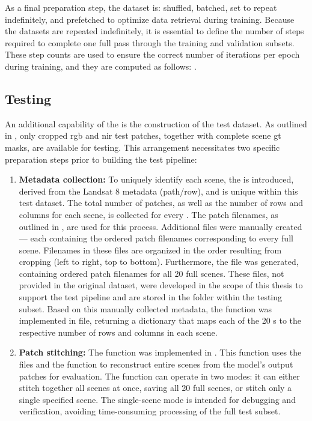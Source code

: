 {As a final preparation step, the dataset is: shuffled, batched, set to repeat indefinitely,
and prefetched to optimize data retrieval during training.
Because the datasets are repeated indefinitely, it is essential to define the number of steps required to complete one full pass through the training and validation subsets.
These step counts are used to ensure the correct number of iterations per epoch during training,
and they are computed as follows: .

\subsection{Testing}
\label{subsec:testing}

An additional capability of the  is the construction of the test dataset.
As outlined in , only cropped \gls{rgb} and \gls{nir} test patches, together with complete scene \gls{gt} masks, are available for testing.
This arrangement necessitates two specific preparation steps prior to building the test pipeline:

\clearpage
\begin{enumerate}
    \item \textbf{Metadata collection:} To uniquely identify each scene, the  is introduced, derived from the Landsat 8 metadata (path/row),
    and is unique within this test dataset. The total number of patches, as well as the number of rows and columns for each scene, is collected for every .
    The patch filenames, as outlined in , are used for this process.
    Additional  files were manually created --- each containing the ordered patch filenames corresponding to every full scene.
    Filenames in these  files are organized in the order resulting from cropping (left to right, top to bottom).
    Furthermore, the  file was generated, containing ordered patch filenames for all 20 full scenes.
    These  files, not provided in the original dataset,
    were developed in the scope of this thesis to support the test pipeline and are stored in the  folder within the testing subset.
    Based on this manually collected metadata, the  function was implemented in  file,
    returning a dictionary that maps each of the 20 s to the respective number of rows and columns in each scene.
    \item \textbf{Patch stitching:} The  function was implemented in .
    This function uses the  files and the  function to reconstruct entire scenes from the model's output patches for evaluation.
    The function can operate in two modes: it can either stitch together all scenes at once, saving all 20 full scenes,
    or stitch only a single specified scene. The single-scene mode is intended for debugging and verification, avoiding time-consuming processing of the full test subset.
\end{enumerate}

}
